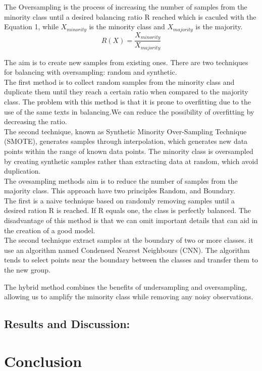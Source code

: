 \documentclass[conference]{IEEEtran}
\begin{document}
	The Oversampling is the process of increasing the number of samples from the minority class until a desired balancing ratio R reached which is  caculed with the Equation 1, while $X_{minority}$ is the minority class and $X_{majority}$ is the majority.
	\begin{equation}
	R(X)= \frac{X_{minority}}{X_{majority}}
	\end{equation}
	
	The aim is to create new samples from existing ones. There are two techniques for balancing with oversampling: random and synthetic.\\
	The first method is to collect random samples from the minority class and duplicate them until they reach a certain ratio when compared to the majority class. The problem with this method is that it is prone to overfitting due to the use of the same texts in balancing.We can reduce the possibility of overfitting by decreasing the ratio. \\
	
	The second technique, known as Synthetic Minority Over-Sampling Technique (SMOTE), generates samples through interpolation, which generates new data points within the range of known data points.
	The minority class is oversampled by creating synthetic samples rather than extracting data at random, which avoid duplication.\\
	
	The ovesampling method\textquotesingle s aim is to reduce the number of samples from the majority class. This approach have two principles Random, and Boundary.\\
	
	The first is a naive technique based on randomly removing samples until a desired ration R is reached. If R equals one, the class is perfectly balanced. The disadvantage of this method is that we can omit important details that can aid in the creation of a good model.\\
	
	The second technique extract samples at the boundary of two or more classes. it use an algorithm named Condensed Nearest Neighbours (CNN). The algorithm tends to select points near the boundary between the classes and transfer them to the new group. 
	
	
	The hybrid method combines the benefits of undersampling and oversampling, allowing us to amplify the minority class while removing any noisy observations. 
	
	
	\subsection{Results and Discussion:}\label{AA}
	
	
	\section{Conclusion}
	
	
	
	
	
\end{document}
